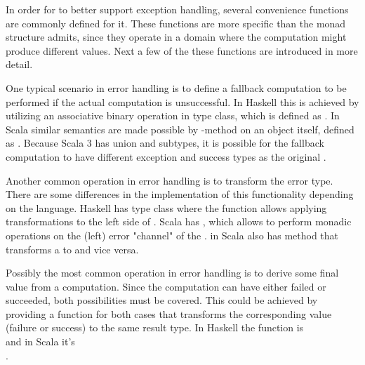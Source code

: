 

In order for  to better support exception handling, several convenience functions are commonly defined for it. These functions are more specific than the monad structure admits, since they operate in a domain where the computation might produce different values. Next a few of the these functions are introduced in more detail.

One typical scenario in error handling is to define a fallback computation to be performed if the actual computation is unsuccessful. In Haskell this is achieved by utilizing an associative binary operation in  type class, which is defined as . In Scala similar semantics are made possible by  -method on an  object itself, defined as . Because Scala 3 has union and subtypes, it is possible for the fallback computation to have different exception and success types as the original .

Another common operation in error handling is to transform the error type. There are some differences in the implementation of this functionality depending on the language. Haskell has  type class where the function  allows applying transformations to the left side of . Scala has , which allows to perform monadic operations on the (left) error "channel" of the .  in Scala also has  method that transforms a  to  and vice versa.

Possibly the most common operation in error handling is to derive some final value from a computation. Since the computation can have either failed or succeeded, both possibilities must be covered. This could be achieved by providing a function for both cases that transforms the corresponding value (failure or success) to the same result type. In Haskell the function is \\ and in Scala it's \\. 


